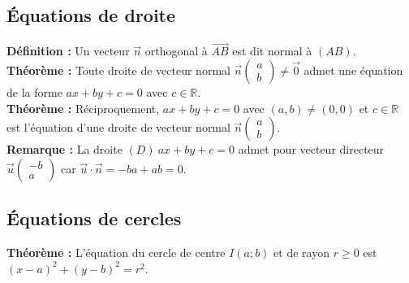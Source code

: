 \documentclass[a4paper,titlepage]{article}
\begin{document}
    \subsection{Équations de droite}
        \textbf{Définition :} Un vecteur $\vec{n}$ orthogonal à $\overrightarrow{AB}$ est dit normal à $\left(AB\right)$.
        \\
        \textbf{Théorème :} Toute droite de vecteur normal $\vec{n}\left(\begin{smallmatrix}a\\b\end{smallmatrix}\right)\neq\overrightarrow{0}$ admet une équation de la forme $ax+by+c=0$ avec $c\in\mathbb{R}$.
        \\
        \textbf{Théorème :} Réciproquement, $ax+by+c=0$ avec $\left(a,b\right)\neq\left(0,0\right)$ et $c\in\mathbb{R}$ est l’équation d’une droite de vecteur normal $\vec{n}\left(\begin{smallmatrix}a\\b\end{smallmatrix}\right)$.
        \\
        \textbf{Remarque :} La droite $\left(D\right)~ax+by+c=0$ admet pour vecteur directeur $\vec{u}\left(\begin{smallmatrix}-b\\a\end{smallmatrix}\right)$ car $\vec{u}\cdot\vec{n}=-ba+ab=0$.
    \subsection{Équations de cercles}
        \textbf{Théorème :} L’équation du cercle de centre $I\left(a;b\right)$ et de rayon $r\geqslant0$ est $\left(x-a\right)^{2}+\left(y-b\right)^{2}=r^{2}$.
\null\newpage
{}
\null\newpage
\null\newpage
\end{document}

